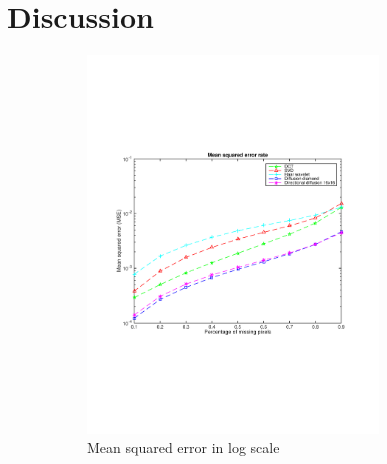 \section{Discussion}
\label{sec:discussion}

\begin{figure}
	\centering
	\begin{subfigure}[b]{0.49\textwidth}
		\centering
		\includegraphics[clip, trim=2cm 7cm 2cm 6cm, width=0.85\textwidth]{figures/mse_vector}
		\caption{Mean squared error in log scale}
		\label{fig:err_random}
	\end{subfigure}
	\begin{subfigure}[b]{0.49\textwidth}
		\centering

\end{subfigure}
\end{figure}
